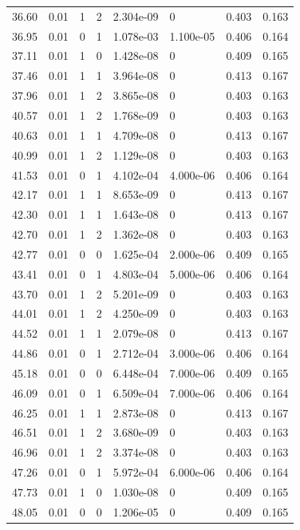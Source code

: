 \documentclass[preview]{standalone}
\begin{document}
{{{\begin{tabular}{L{1.2cm}C{1.2cm} C{0.3cm}C{0.5cm} C{1.4cm}C{1.4cm} C{1.4cm}C{1.4cm}}
  36.60  &  0.01  & 1     &  2 &  2.304e-09  & 0  & 0.403 &  0.163   \\ 
  36.95  &  0.01  & 0     &  1 &  1.078e-03  & 1.100e-05  & 0.406 &  0.164   \\ 
  37.11  &  0.01  & 1     &  0 &  1.428e-08  & 0  & 0.409 &  0.165   \\ 
  37.46  &  0.01  & 1     &  1 &  3.964e-08  & 0  & 0.413 &  0.167   \\ 
  37.96  &  0.01  & 1     &  2 &  3.865e-08  & 0  & 0.403 &  0.163   \\ 
  40.57  &  0.01  & 1     &  2 &  1.768e-09  & 0  & 0.403 &  0.163   \\ 
  40.63  &  0.01  & 1     &  1 &  4.709e-08  & 0  & 0.413 &  0.167   \\ 
  40.99  &  0.01  & 1     &  2 &  1.129e-08  & 0  & 0.403 &  0.163   \\ 
  41.53  &  0.01  & 0     &  1 &  4.102e-04  & 4.000e-06  & 0.406 &  0.164   \\ 
  42.17  &  0.01  & 1     &  1 &  8.653e-09  & 0  & 0.413 &  0.167   \\ 
  42.30  &  0.01  & 1     &  1 &  1.643e-08  & 0  & 0.413 &  0.167   \\ 
  42.70  &  0.01  & 1     &  2 &  1.362e-08  & 0  & 0.403 &  0.163   \\ 
  42.77  &  0.01  & 0     &  0 &  1.625e-04  & 2.000e-06  & 0.409 &  0.165   \\ 
  43.41  &  0.01  & 0     &  1 &  4.803e-04  & 5.000e-06  & 0.406 &  0.164   \\ 
  43.70  &  0.01  & 1     &  2 &  5.201e-09  & 0  & 0.403 &  0.163   \\ 
  44.01  &  0.01  & 1     &  2 &  4.250e-09  & 0  & 0.403 &  0.163   \\ 
  44.52  &  0.01  & 1     &  1 &  2.079e-08  & 0  & 0.413 &  0.167   \\ 
  44.86  &  0.01  & 0     &  1 &  2.712e-04  & 3.000e-06  & 0.406 &  0.164   \\ 
  45.18  &  0.01  & 0     &  0 &  6.448e-04  & 7.000e-06  & 0.409 &  0.165   \\ 
  46.09  &  0.01  & 0     &  1 &  6.509e-04  & 7.000e-06  & 0.406 &  0.164   \\ 
  46.25  &  0.01  & 1     &  1 &  2.873e-08  & 0  & 0.413 &  0.167   \\ 
  46.51  &  0.01  & 1     &  2 &  3.680e-09  & 0  & 0.403 &  0.163   \\ 
  46.96  &  0.01  & 1     &  2 &  3.374e-08  & 0  & 0.403 &  0.163   \\ 
  47.26  &  0.01  & 0     &  1 &  5.972e-04  & 6.000e-06  & 0.406 &  0.164   \\ 
  47.73  &  0.01  & 1     &  0 &  1.030e-08  & 0  & 0.409 &  0.165   \\ 
  48.05  &  0.01  & 0     &  0 &  1.206e-05  & 0  & 0.409 &  0.165   \\ 
\hline 
\end{tabular} 

}}}
\end{document}
